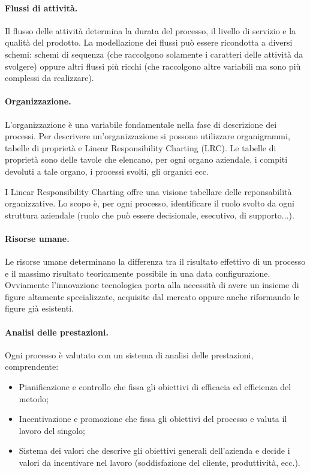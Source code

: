 \documentclass[a4paper, 10pt]{article}
\begin{document}
	\paragraph{Flussi di attività.} Il flusso delle attività determina la durata del processo, il livello di servizio e la qualità del prodotto. La modellazione dei flussi può essere ricondotta a diversi schemi: schemi di sequenza (che raccolgono solamente i caratteri delle attività da svolgere) oppure altri flussi più ricchi (che raccolgono altre variabili ma sono più complessi da realizzare).
	
	\paragraph{Organizzazione.} L'organizzazione è una variabile fondamentale nella fase di descrizione dei processi. Per descrivere un'organizzazione si possono utilizzare organigrammi, tabelle di proprietà e Linear Responsibility Charting (LRC). Le tabelle di proprietà sono delle tavole che elencano, per ogni organo aziendale, i compiti devoluti a tale organo, i processi svolti, gli organici ecc.
	
	I Linear Responsibility Charting offre una visione tabellare delle reponsabilità organizzative. Lo scopo è, per ogni processo, identificare il ruolo svolto da ogni struttura aziendale (ruolo che può essere decisionale, esecutivo, di supporto...). 
	
	\paragraph{Risorse umane.} Le risorse umane determinano la differenza tra il risultato effettivo di un processo e il massimo risultato teoricamente possibile in una data configurazione. Ovviamente l'innovazione tecnologica porta alla necessità di avere un insieme di figure altamente specializzate, acquisite dal mercato oppure anche riformando le figure già esistenti.
	
	\paragraph{Analisi delle prestazioni.} Ogni processo è valutato con un sistema di analisi delle prestazioni, comprendente: \begin{itemize}
		\item Pianificazione e controllo che fissa gli obiettivi di efficacia ed efficienza del metodo;
		\item Incentivazione e promozione che fissa gli obiettivi del processo e valuta il lavoro del singolo;
		\item Sistema dei valori che descrive gli obiettivi generali dell'azienda e decide i valori da incentivare nel lavoro (soddisfazione del cliente, produttività, ecc.).
	\end{itemize}
\end{document}
